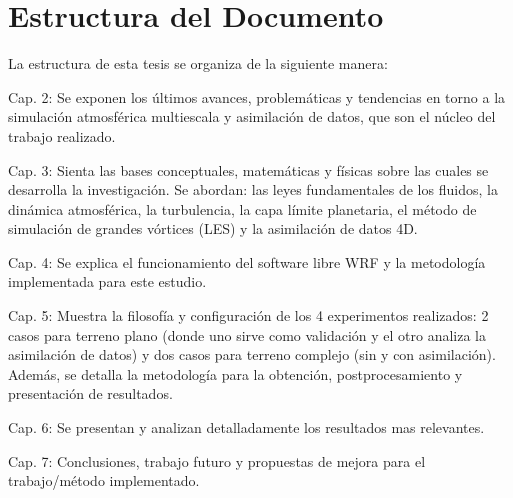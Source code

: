 \section{Estructura del Documento}
La estructura de esta tesis se organiza de la siguiente manera:
\begin{itemize*}
	\item Cap. 2: Se exponen los últimos avances, problemáticas y tendencias en torno a la simulación atmosférica multiescala y asimilación de datos, que son el núcleo del trabajo realizado.
	\item Cap. 3: Sienta las bases conceptuales, matemáticas y físicas sobre las cuales se desarrolla la investigación. Se abordan: las leyes fundamentales de los fluidos, la dinámica atmosférica, la turbulencia, la capa límite planetaria, el método de simulación de grandes vórtices (LES) y la asimilación de datos 4D.
	\item Cap. 4: Se explica el funcionamiento del software  libre WRF y la metodología implementada para este estudio.
	\item Cap. 5: Muestra la filosofía y configuración de los 4 experimentos realizados: 2 casos para terreno plano (donde uno sirve como validación y el otro analiza la asimilación de datos) y dos casos para terreno complejo (sin y con asimilación). Además, se detalla la metodología para la obtención, postprocesamiento y presentación de resultados.
	\item Cap. 6: Se presentan y analizan detalladamente los resultados mas relevantes.
	\item Cap. 7: Conclusiones, trabajo futuro y propuestas de mejora para el trabajo/método implementado.
\end{itemize*}
